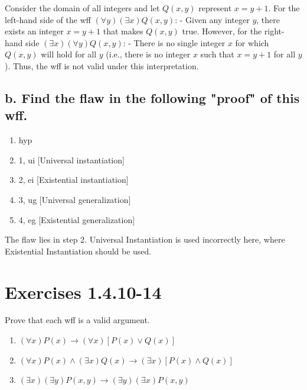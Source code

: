 \documentclass[12pt]{article}
\begin{document}
Consider the domain of all integers and let \( Q(x, y) \) represent \( x = y + 1 \).
\newline\newline
For the left-hand side of the wff \( (\forall y)(\exists x)Q(x,y) \):
\newline
- Given any integer \( y \), there exists an integer \( x = y + 1 \) that makes \( Q(x, y) \) true.
\newline\newline
However, for the right-hand side \( (\exists x)(\forall y)Q(x,y) \):
\newline
- There is no single integer \( x \) for which \( Q(x, y) \) will hold for all \( y \) (i.e., there is no integer \( x \) such that \( x = y + 1 \) for all \( y \)).
\newline \newline
Thus, the wff is not valid under this interpretation.

\subsection*{b. Find the flaw in the following "proof" of this wff.}

\begin{enumerate}[left=0em,labelwidth=4em,align=left]
    \item[\( (\forall y)(\exists x)Q(x,y) \)] \hfill hyp
    \item[\( (\exists x)Q(x,y) \)] \hfill 1, ui [Universal instantiation]
    \item[\( Q(a, y) \)] \hfill 2, ei [Existential instantiation]
    \item[\( (\forall y)Q(a,y) \)] \hfill 3, ug [Universal generalization]
    \item[\( (\exists x)(\forall y)Q(x,y) \)] \hfill 4, eg [Existential generalization]
\end{enumerate}
The flaw lies in step 2. Universal Instantiation is used incorrectly here, where Existential Instantiation should be used.

\newpage
\section*{Exercises 1.4.10-14}

Prove that each wff is a valid argument.

\begin{enumerate}
    \item[\textbf{10.}] \( (\forall x)P(x) \rightarrow (\forall x)[P(x)\lor Q(x)] \)
    
    \item[\textbf{11.}] \( (\forall x)P(x)\land (\exists x)Q(x)\rightarrow (\exists x)[P(x)\land Q(x)] \)
    
    \item[\textbf{12.}] \( (\exists x)(\exists y)P(x,y)\rightarrow (\exists y)(\exists x)P(x,y) \)
\end{enumerate}
\end{document}
